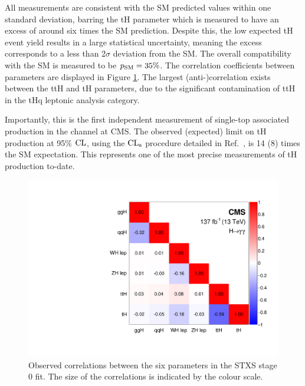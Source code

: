 All measurements are consistent with the SM predicted values within one standard deviation, barring the tH parameter which is measured to have an excess of around six times the SM prediction. Despite this, the low expected tH event yield results in a large statistical uncertainty, meaning the excess corresponds to a less than 2$\sigma$ deviation from the SM. The overall compatibility with the SM is measured to be $p_{\rm{SM}}=35\%$. The correlation coefficients between parameters are displayed in Figure \ref{fig:stage0_correlations}. The largest (anti-)correlation exists between the ttH and tH parameters, due to the significant contamination of ttH in the tHq leptonic analysis category.

Importantly, this is the first independent measurement of single-top associated production in the \Hgg channel at CMS. The observed (expected) limit on tH production at 95\% $\rm{CL}$, using the $\rm{CL}_s$ procedure detailed in Ref.~\cite{CMS-NOTE-2011-005}, is 14 (8) times the SM expectation. This represents one of the most precise measurements of tH production to-date.

\begin{figure}[htbp]
  \centering
  \includegraphics[width=.5\textwidth]{Figures/hgg_results/stage0_correlations.pdf}
  \caption[Correlations in the STXS stage 0 parameters]
  {
    Observed correlations between the six parameters in the STXS stage 0 fit. The size of the correlations is indicated by the colour scale.
  }
  \label{fig:stage0_correlations}
\end{figure}

